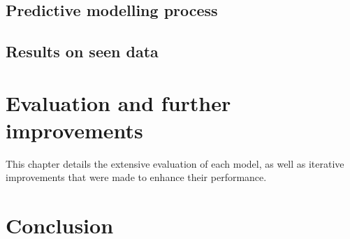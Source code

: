 \documentclass[12pt]{report}
\begin{document}
\section{Predictive modelling process}

\section{Results on seen data}

\chapter{Evaluation and further improvements}
This chapter details the extensive evaluation of each model, as well as iterative improvements 
that were made to enhance their performance.

\chapter{Conclusion}




\end{document}
